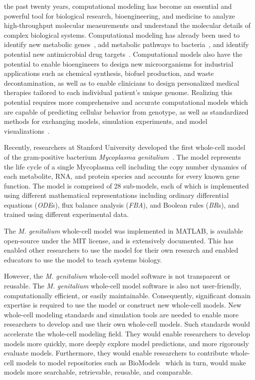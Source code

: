 \documentclass[journal,transmag]{IEEEtran}
\begin{document}
 the past twenty years, computational modeling has become an essential and powerful tool for biological research, bioengineering, and medicine to analyze high-throughput molecular measurements and understand the molecular details of complex biological systems. Computational modeling has already been used to identify new metabolic genes~\cite{Reed2006}, add metabolic pathways to bacteria~\cite{Lee2009}, and identify potential new antimicrobial drug targets~\cite{Lee2012}. Computational models also have the potential to enable bioengineers to design new microorganisms for industrial applications such as chemical synthesis, biofuel production, and waste decontamination, as well as to enable clinicians to design personalized medical therapies tailored to each individual patient's unique genome. Realizing this potential requires more comprehensive and accurate computational models which are capable of predicting cellular behavior from genotype, as well as standardized methods for exchanging models, simulation experiments, and model visualizations~\cite{Macklin2014,Karr2015,hucka2015promoting,Klipp07}.

Recently, researchers at Stanford University developed the first whole-cell model of the gram-positive bacterium \textit{Mycoplasma genitalium}~\cite{Karr2012}. The model represents the life cycle of a single Mycoplasma cell including the copy number dynamics of each metabolite, RNA, and protein species and accounts for every known gene function. The model is comprised of 28 sub-models, each of which is implemented using different mathematical representations including ordinary differential equations (\emph{ODE}s), flux balance analysis (\emph{FBA}), and Boolean rules (\emph{BR}s), and trained using different experimental data. 

The \textit{M. genitalium} whole-cell model was implemented in MATLAB, is available open-source under the MIT license, and is extensively documented. This has enabled other researchers to use the model for their own research and enabled educators to use the model to teach systems biology. 

However, the \textit{M. genitalium} whole-cell model software is not transparent or reusable. The \textit{M. genitalium} whole-cell model software is also not user-friendly, computationally efficient, or easily maintainable. Consequently, significant domain expertise is required to use the model or construct new whole-cell models. New whole-cell modeling standards and simulation tools are needed to enable more researchers to develop and use their own whole-cell models. Such standards would accelerate the whole-cell modeling field. They would enable researchers to develop models more quickly, more deeply explore model predictions, and more rigorously evaluate models. Furthermore, they would enable researchers to contribute whole-cell models to model repositories such as BioModels~\cite{li2010biomodels} which in turn, would make models more searchable, retrievable, reusable, and comparable.
\end{document}
